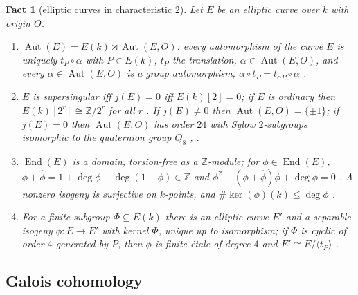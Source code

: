 \documentclass[11pt]{amsart}
\newtheorem{fact}[theorem]{Fact}
\theoremstyle{definition}
\theoremstyle{remark}
\newcommand{\Z}{\mathbb Z}
\newcommand{\Aut}{\operatorname{Aut}}
\newcommand{\End}{\operatorname{End}}
\begin{document}
\begin{fact}[elliptic curves in characteristic $2$]\label{fact:ell}
Let $E$ be an elliptic curve over $k$ with origin $O$.
\begin{enumerate}[label=\textup{(\alph*)}]
\item $\Aut(E)=E(k)\rtimes\Aut(E,O)$: every automorphism of the curve $E$ is uniquely
$t_P\circ\alpha$ with $P\in E(k)$, $t_P$ the translation, $\alpha\in\Aut(E,O)$, and
every $\alpha\in\Aut(E,O)$ is a group automorphism, $\alpha\circ t_P=t_{\alpha P}\circ\alpha$
\cite[III.4.8]{Sil}.
\item $E$ is supersingular iff $j(E)=0$ iff $E(k)[2]=0$; if $E$ is ordinary then
$E(k)[2^r]\cong\Z/2^r$ for all $r$ \cite[V.3.1, Exercise 5.7]{Sil}. If $j(E)\ne0$ then
$\Aut(E,O)=\{\pm1\}$; if $j(E)=0$ then $\Aut(E,O)$ has order $24$ with Sylow
$2$-subgroups isomorphic to the quaternion group $Q_8$ \cite[App.~A, Prop.~1.2]{Sil},
\cite[Lemma 2.5(iii)]{P}.
\item $\End(E)$ is a domain, torsion-free as a $\Z$-module; for $\phi\in\End(E)$,
$\phi+\hat\phi=1+\deg\phi-\deg(1-\phi)\in\Z$ and $\phi^2-(\phi+\hat\phi)\phi+\deg\phi=0$
\cite[III.4.2, III.6.2, III.6.3]{Sil}. A nonzero isogeny is surjective on $k$-points,
and $\#\ker(\phi)(k)\le\deg\phi$ \cite[II.2.3, III.4.10]{Sil}.
\item For a finite subgroup $\Phi\subseteq E(k)$ there is an elliptic curve $E'$ and a
separable isogeny $\phi\colon E\to E'$ with kernel $\Phi$, unique up to isomorphism; if
$\Phi$ is cyclic of order $4$ generated by $P$, then $\phi$ is finite \'etale of degree
$4$ and $E'\cong E/\langle t_P\rangle$ \cite[III.4.12]{Sil}.
\end{enumerate}
\end{fact}

\subsection{Galois cohomology}
\end{document}
